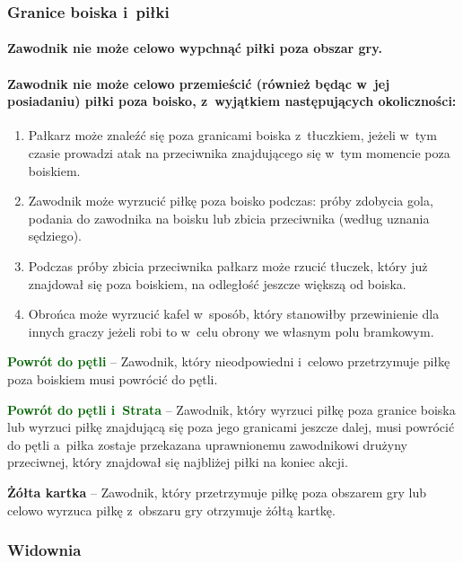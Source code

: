\documentclass[12pt,a4paper]{article}
\newcommand\yellowcard[1]{\bgroup\textcolor{darkyellow}{\textbf{#1}}}
\newcommand\other[1]{\bgroup\textcolor{darkgreen}{\textbf{#1}}}
\begin{document}
\subsubsection{Granice boiska i~piłki}

\paragraph{Zawodnik nie może celowo wypchnąć piłki poza obszar gry.}

\paragraph{Zawodnik nie może celowo przemieścić (również będąc w~jej posiadaniu) piłki poza boisko, z~wyjątkiem następujących okoliczności:}

\begin{enumerate}
	\item
	      Pałkarz może znaleźć się poza granicami boiska z~tłuczkiem, jeżeli w~tym czasie prowadzi atak na przeciwnika znajdującego się w~tym
	      momencie poza boiskiem.
	\item
	      Zawodnik może wyrzucić piłkę poza boisko podczas: próby zdobycia gola,
	      podania do zawodnika na boisku lub zbicia przeciwnika (według uznania
	      sędziego).
	\item
	      Podczas próby zbicia przeciwnika pałkarz może rzucić tłuczek, który
	      już znajdował się poza boiskiem, na odległość jeszcze większą od
	      boiska.
	\item
	      Obrońca może wyrzucić kafel w~sposób, który stanowiłby przewinienie
	      dla innych graczy jeżeli robi to w~celu obrony we własnym polu
	      bramkowym.
\end{enumerate}

\other{Powrót do pętli} -- Zawodnik, który nieodpowiedni i~celowo
przetrzymuje piłkę poza boiskiem musi powrócić do pętli.

\other{Powrót do pętli i~Strata} -- Zawodnik, który wyrzuci piłkę poza
granice boiska lub wyrzuci piłkę znajdującą się poza jego granicami
jeszcze dalej, musi powrócić do pętli a~piłka zostaje przekazana
uprawnionemu zawodnikowi drużyny przeciwnej, który znajdował się
najbliżej piłki na koniec akcji.

\yellowcard{Żółta kartka} -- Zawodnik, który przetrzymuje piłkę poza obszarem
gry lub celowo wyrzuca piłkę z~obszaru gry otrzymuje żółtą kartkę.

\subsubsection{Widownia}
\end{document}
